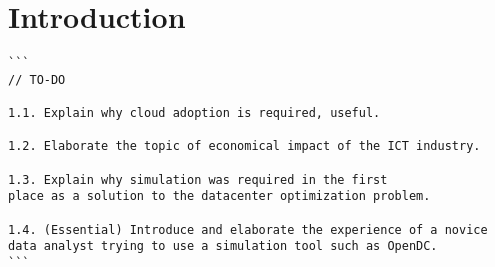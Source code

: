 \section{Introduction}
\begin{verbatim}
```
// TO-DO

1.1. Explain why cloud adoption is required, useful.

1.2. Elaborate the topic of economical impact of the ICT industry.

1.3. Explain why simulation was required in the first 
place as a solution to the datacenter optimization problem.

1.4. (Essential) Introduce and elaborate the experience of a novice 
data analyst trying to use a simulation tool such as OpenDC.
```
\end{verbatim}